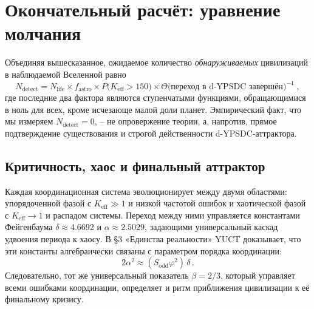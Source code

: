 \documentclass[11pt,a4paper]{article}
\newcommand{\Keff}{K_{\mathrm{eff}}}
\begin{document}
	\section{Окончательный расчёт: уравнение молчания}
	\label{sec:final}
	Объединяя вышесказанное, ожидаемое количество \emph{обнаруживаемых} цивилизаций в наблюдаемой Вселенной равно
	\begin{equation}
		\label{eq:N_detect}
		N_{\mathrm{detect}} = N_{\mathrm{life}}
		\times f_{\mathrm{astro}}
		\times P\bigl(\Keff > 150\bigr)
		\times \Theta\bigl(\text{переход в d-YPSDC завершён}\bigr)^{-1}\; ,
	\end{equation}
	где последние два фактора являются ступенчатыми функциями, обращающимися в ноль для всех, кроме исчезающе малой доли планет. Эмпирический факт, что мы измеряем \(N_{\mathrm{detect}} = 0\), – не опровержение теории, а, напротив, прямое подтверждение существования и строгой действенности d-YPSDC-аттрактора.
	
	\subsection{Критичность, хаос и финальный аттрактор}
	\label{sec:chaos}
	
	Каждая координационная система эволюционирует между двумя областями: упорядоченной фазой с \(K_{\mathrm{eff}} \gg 1\) и низкой частотой ошибок и хаотической фазой с \(K_{\mathrm{eff}} \to 1\) и распадом системы. Переход между ними управляется константами Фейгенбаума \(\delta \approx 4.6692\) и \(\alpha \approx 2.5029\), задающими универсальный каскад удвоения периода к хаосу. В §3 «Единства реальности» YUCT доказывает, что эти константы алгебраически связаны с параметром порядка координации:
	\begin{equation}
		2\alpha^{2} \approx (S_{\mathrm{odd}}\varphi^{2})\,\delta \, .
	\end{equation}
	Следовательно, тот же универсальный показатель \(\beta = 2/3\), который управляет всеми ошибками координации, определяет и ритм приближения цивилизации к её финальному кризису.
	
\end{document}

